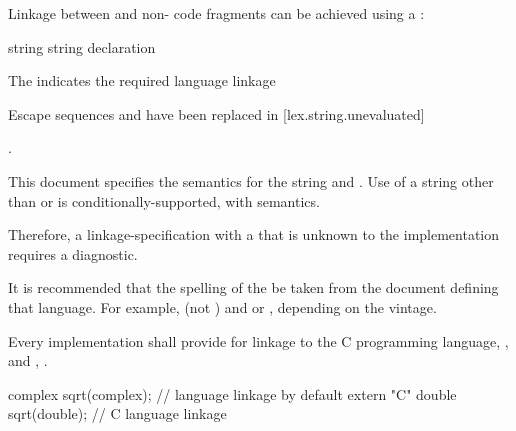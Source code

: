 \documentclass{wg21}
\begin{document}
\pnum
Linkage between \Cpp{} and  non-\Cpp{} code fragments can
be achieved using a :

%
%
%
\begin{bnf}
    \br
     string \terminal{\{}  \terminal{\}}\br
     string declaration
\end{bnf}

The  indicates the required language linkage
\begin{addedblock}
\begin{note}
Escape sequences and  have been replaced in [lex.string.unevaluated]
\end{note}
\end{addedblock}
.

This document specifies the semantics for the
string  and . Use of a
string other than  or  is
conditionally-supported, with  semantics.
\begin{note}
    Therefore, a linkage-specification with a  that
    is unknown to the implementation requires a diagnostic.
\end{note}
\begin{note}
    It is recommended that the spelling of the  be
    taken from the document defining that language. For example, 
    (not ) and  or , depending on
    the vintage.
\end{note}


\pnum
{}%
Every implementation shall provide for linkage to the C programming language,
%
, and \Cpp{}, .
\begin{example}
    \begin{codeblock}
        complex sqrt(complex);          // \Cpp{} language linkage by default
        extern "C" {
            double sqrt(double);          // C language linkage
        }
    \end{codeblock}
\end{example}
\end{document}
